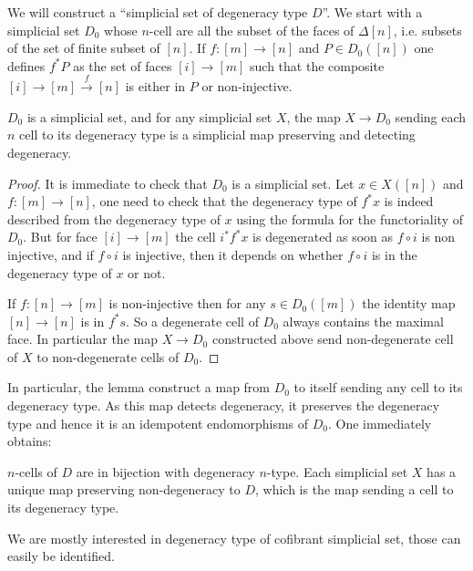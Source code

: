 \documentclass[reqno,10pt,a4paper,oneside,draft]{amsart}
\begin{document}
We will construct a ``simplicial set of degeneracy type $D$''. We start with a simplicial set $D_0$ whose $n$-cell are all the subset of the faces of $\Delta[n]$, i.e. subsets of the set of finite subset of $[n]$. If $f : [m] \rightarrow [n]$ and $P \in D_0([n])$ one defines $f^* P$ as the set of faces  $[i] \rightarrow [m]$ such that the composite $[i] \rightarrow [m] \overset{f}{\rightarrow} [n]$ is either in $P$ or non-injective.

\begin{lemma}
$D_0$ is a simplicial set, and for any simplicial set $X$, the map $X \rightarrow D_0$ sending each $n$ cell to its degeneracy type is a simplicial map preserving and detecting degeneracy.
\end{lemma}

\begin{proof}
It is immediate to check that $D_0$ is a simplicial set. Let $x \in X([n])$ and $f:[m] \rightarrow [n]$, one need to check that the degeneracy type of $f^* x$ is indeed described from the degeneracy type of $x$ using the formula for the functoriality of $D_0$. But for face $[i] \rightarrow [m]$ the cell $i^* f^* x$ is degenerated as soon as $f \circ i$ is non injective, and if $f\circ i$ is injective, then it depends on whether $f \circ i$ is in the degeneracy type of $x$ or not.

If $f:[n] \rightarrow [m]$ is non-injective then for any $s \in D_0([m])$ the identity map $[n] \rightarrow [n]$ is in $f^* s$. So a degenerate cell of $D_0$ always contains the maximal face. In particular the map $X \rightarrow D_0$ constructed above send non-degenerate cell of $X$ to non-degenerate cells of $D_0$.

\end{proof}

In particular, the lemma construct a map from $D_0$ to itself sending any cell to its degeneracy type. As this map detects degeneracy, it preserves the degeneracy type and hence it is an idempotent endomorphisms of $D_0$. One immediately obtains:

\begin{lemma}
$n$-cells of $D$ are in bijection with degeneracy $n$-type. Each simplicial set $X$ has a unique map preserving non-degeneracy to $D$, which is the map sending a cell to its degeneracy type.
\end{lemma}




We are mostly interested in degeneracy type of cofibrant simplicial set, those can easily be identified.
\end{document}
